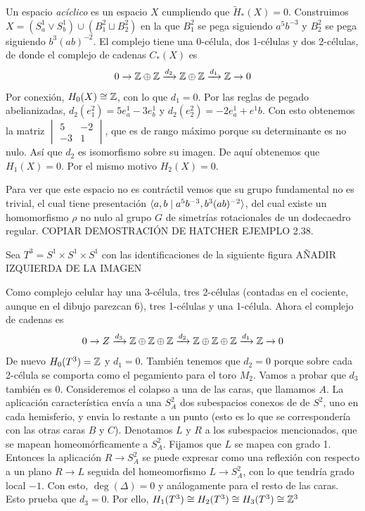 \documentclass[TA.tex]{subfiles}
\begin{document}
\begin{ej}
Un espacio \emph{acíclico} es un espacio $X$ cumpliendo que $\widetilde{H}_*(X)=0$. Construimos $X=(S^1_a\vee S^1_b)\cup (B_1^2\sqcup B^2_2)$ en la que $B_1^2$ se pega siguiendo $a^5b^{-3}$ y $B_2^2$ se pega siguiendo $b^3(ab)^{-2}$. El complejo tiene una 0-célula, dos 1-células y dos 2-células, de donde el complejo de cadenas $C_*(X)$ es
\[
0\to \mathbb{Z}\oplus\mathbb{Z}\xrightarrow{d_2}\mathbb{Z}\oplus\mathbb{Z}\xrightarrow{d_1}\mathbb{Z}\to 0
\]
Por conexión, $H_0(X)\cong\mathbb{Z}$, con lo que $d_1=0$. Por las reglas de pegado abelianizadas, $d_2(e^2_1)=5e^1_a-3e_b^1$ y $d_2(e^2_2)=-2e_a^1+e^1b$. Con esto obtenemos la matriz $\begin{vmatrix}
5 & -2\\
-3 & 1
\end{vmatrix}$, que es de rango máximo porque su determinante es no nulo. Así que $d_2$ es isomorfismo sobre su imagen. De aquí obtenemos que $H_1(X)=0$. Por el mismo motivo $H_2(X)=0$. 

Para ver que este espacio no es contráctil vemos que su grupo fundamental no es trivial, el cual tiene presentación $\langle{a,b\mid a^5b^{-3}, b^3(ab)^{-2}}\rangle$, del cual existe un homomorfismo $\rho$ no nulo al grupo $G$ de simetrías rotacionales de un dodecaedro regular. COPIAR DEMOSTRACIÓN DE HATCHER EJEMPLO 2.38. 
\end{ej}


\begin{ej}
Sea $T^3=S^1\times S^1\times S^1$ con las identificaciones de la siguiente figura AÑADIR IZQUIERDA DE LA IMAGEN

Como complejo celular hay una 3-célula, tres 2-células (contadas en el cociente, aunque en el dibujo parezcan 6), tres 1-células y una 1-célula. Ahora el complejo de cadenas es
\[
0\to Z\xrightarrow{d_3}\mathbb{Z}\oplus\mathbb{Z}\oplus\mathbb{Z}\xrightarrow{d_2}\mathbb{Z}\oplus\mathbb{Z}\oplus\mathbb{Z}\xrightarrow{d_1}\mathbb{Z}\to 0
\]
De nuevo $H_0(T^3)=\mathbb{Z}$ y $d_1=0$. También tenemos que $d_2=0$ porque sobre cada 2-célula se comporta como el pegamiento para el toro $M_2$. Vamos a probar que $d_3$ también es 0. Consideremos el colapso a una de las caras, que llamamos $A$. La aplicación característica envía a una $S^2_A$ dos subespacios conexos de de $S^2$, uno en cada hemisferio, y envia lo restante a un punto (esto es lo que se correspondería con las otras caras $B$ y $C$). Denotamos $L$ y $R$ a los subespacios mencionados, que se mapean homeomórficamente a $S^2_A$. Fijamos que $L$ se mapea con grado 1. Entonces la aplicación $R\to S^2_A$ se puede expresar como una reflexión con respecto a un plano $R\to L$ seguida del homeomorfismo $L\to S^2_A$, con lo que tendría grado local $-1$. Con esto, $\deg(\Delta)=0$ y análogamente para el resto de las caras. Esto prueba que $d_3=0$. Por ello, $H_1(T^3)\cong H_2(T^3)\cong H_3(T^3)\cong \mathbb{Z}^3$ 
\end{ej}
\end{document}
